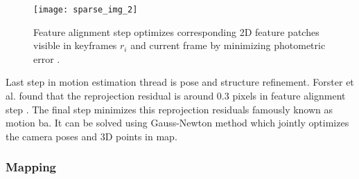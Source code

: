 \begin{figure}[H]
	\centering
	\texttt{[image: sparse\_img\_2]}
	\caption{Feature alignment step optimizes corresponding 2D feature patches visible in keyframes $ r_{i} $ and current frame by minimizing photometric error \cite{Forster2014ICRA}.}
	\label{fig:sparse_img_2}
\end{figure}
\noindent Last step in motion estimation thread is pose and structure refinement. Forster et al. found that the reprojection residual is around 0.3 pixels in feature alignment step \cite{Forster2014ICRA}. The final step minimizes this reprojection residuals famously known as motion \acrshort{ba}. It can be solved using Gauss-Newton method which jointly optimizes the camera poses and 3D points in map. \\

\subsubsection{Mapping}


